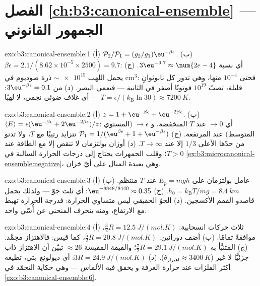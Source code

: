 \section*{الفصل \ref{ch:b3:canonical-ensemble} --- الجمهور القانوني}

\begin{solution}{exo:b3:canonical-ensemble:1}
(أ) $\mathcal P_2/\mathcal P_1 = (g_2/g_1)\eu^{-\beta\epsilon}$.
(ب) $\beta\epsilon = 2.1/(8.62\times10^{-5} \times 2500) = 9.7$: أي
نسبة $3\eu^{-9.7} \approx \num{2e-4}$. (ج) يحمل اللهب
$\sim\num{e15}$ ذرة صوديوم في cm$^3$: فحتى $10^{-4}$ منها،
وهي تدور كل نانوثوانٍ قليلة، تصبّ $10^{19}$ فوتونًا أصفر
في الثانية --- فتعمي البصر. (د) من $3\eu^{-\beta\epsilon} = 0.1$:
$T = \epsilon/(k_{\text{B}}\ln30) \approx \qty{7200}{K}$ --- أي
غلاف ضوئي نجمي، لا لهبًا.
\end{solution}

\begin{solution}{exo:b3:canonical-ensemble:2}
(أ) $z = 1 + \eu^{-\beta\epsilon} + \eu^{-2\beta\epsilon}$. (ب)
$\langle E\rangle = \epsilon(\eu^{-\beta\epsilon} +
2\eu^{-2\beta\epsilon})/z$: أي $\to 0$ عند $T$ المنخفضة، و $\to \epsilon$
(المستوي المتوسط) عند المرتفعة. (ج) $\mathcal P_1 = 1/(\eu^{\beta
\epsilon} + 1 + \eu^{-\beta\epsilon})$ تتزايد رتيبًا مع
$T$، ولا تدنو من حدّها الأعلى $1/3$ إلا عند $T \to \infty$. (د)
أوزان بولتزمان لا تنقص إلا مع الطاقة عند $T > 0$؛ وقلب
الجمهرات يحتاج إلى درجات الحرارة السالبة في
\cref{ex:b3:microcanonical-ensemble:negative}، وهي بعيدة المنال على أيّ
خزان.
\end{solution}

\begin{solution}{exo:b3:canonical-ensemble:3}
(أ) عامل بولتزمان على $E_p = mgh$ عند $T$ منتظم. (ب) $h_0 =
k_{\text{B}}T/mg = \qty{8.4}{km}$. (ج) $\eu^{-8848/8440} \approx
0.35$: أي ثلث جوّ --- ولذلك يحمل قاصدو القمم الأكسجين.
(د) الجوّ الحقيقي ليس متساوي الحرارة: فدرجة الحرارة تهبط مع
الارتفاع، ومنه ينحرف المنحني عن أُسّي واحد.
\end{solution}

\begin{solution}{exo:b3:canonical-ensemble:4}
(أ) ثلاث حركات انسحابية: $\tfrac32 R = \qty{12.5}{J/(mol.K)}$،
موافقةً تمامًا. (ب) أضف دورانين: $\tfrac52 R =
\qty{20.8}{J/(mol.K)}$، كما قيس: فالاهتزاز مجمَّد. (ج)
المتنبَّأ به $\tfrac72 R = \qty{29.1}{J/(mol.K)}$؛ والقيمة المقيسة
$\approx26$ تبيّن أن الاهتزاز ذاب جزئيًّا لا غير ($\theta_{\text{اهتزاز}}
\approx \qty{3400}{K}$). (د) $3R = \qty{24.9}{J/(mol.K)}$:
أي ديولونغ--بتي، تطيعه أكثر الفلزات عند حرارة الغرفة و
يخفق فيه الألماس --- وهي حكاية التجمّد في
\cref{exo:b3:canonical-ensemble:6}.
\end{solution}

